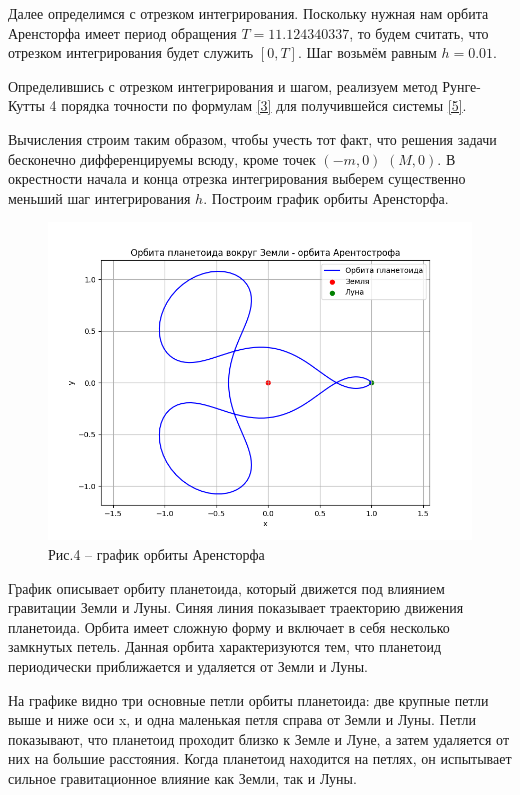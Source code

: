 \documentclass[a4paper,12pt]{article}
\begin{document}
{Далее определимся с отрезком интегрирования. Поскольку нужная нам орбита Арен\-сторфа имеет период обращения $T = 11.124340337$, то будем считать,
что отрезком инте\-гри\-рования будет служить $[0,T]$. Шаг возьмём равным $h = 0.01$.

Определившись с отрезком интегрирования и шагом, реализуем метод Рунге-Кутты 4 порядка точности по формулам \eqref{3} для получившейся системы \eqref{5}.

Вычисления строим таким образом, чтобы учесть тот факт, что решения задачи бесконечно дифференцируемы всюду, кроме точек $(-m, 0)$ $(M, 0)$.
В окрестности начала и конца отрезка интегрирования выберем существенно меньший шаг интегрирования $h$. Построим график орбиты Аренсторфа.
\begin{figure}[ht]
	\centering
	\includegraphics[width=\textwidth]{plot_main_task.png}
	\caption*{{\small Рис.4 -- график орбиты Аренсторфа}}
\end{figure}

График описывает орбиту планетоида, который движется под влиянием гравитации Земли и Луны.
Синяя линия показывает траекторию движения планетоида. Орбита имеет сложную форму и включает в себя несколько замкнутых петель.
Данная орбита харак\-те\-ризуются тем, что планетоид периодически приближается и удаляется от Земли и Луны.

На графике видно три основные петли орбиты планетоида: две крупные петли выше и ниже оси x, и одна маленькая петля справа от Земли и Луны.
Петли показывают, что планетоид проходит близко к Земле и Луне, а затем удаляется от них на большие расстояния.
Когда планетоид находится на петлях, он испытывает сильное гравитационное влияние как Земли, так и Луны.

}
\end{document}

